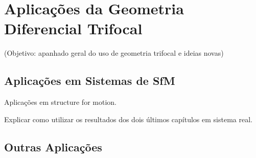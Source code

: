 \section{Aplicações da Geometria Diferencial Trifocal}
(Objetivo: apanhado geral do uso de geometria trifocal e ideias novas)

\subsection{Aplicações em Sistemas de SfM}
Aplicações em structure for motion.

Explicar como utilizar os resultados dos dois últimos capítulos em sistema real.

\subsection{Outras Aplicações}
